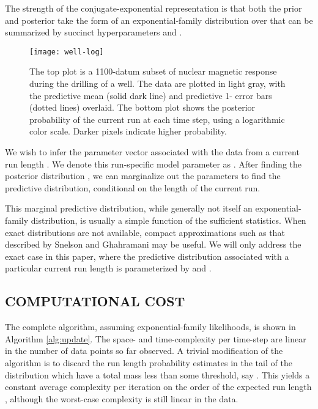 \documentclass[]{article}
\begin{document}
      The strength of the conjugate-exponential representation is that both
      the prior and posterior take the form of an exponential-family
      distribution over  that can be summarized by succinct
      hyperparameters  and .
      

      \begin{figure*}[t]
	\centering
	\texttt{[image: well-log]}
	\vskip -0.5cm
	\caption{The top plot is a 1100-datum subset of nuclear magnetic
	response during the drilling of a well.  The data are plotted in
	light gray, with the predictive mean (solid dark line) and
	predictive 1- error bars (dotted lines) overlaid.  The
	bottom plot shows the posterior probability of the current run
	 at each time step, using a logarithmic
	color scale.  Darker pixels indicate higher probability.}
	\label{fig:well-log}
      \end{figure*}
 
      We wish to infer the parameter vector  associated with the
      data from a current run length .  We denote this run-specific
      model parameter as .  After finding the posterior
      distribution , we
      can marginalize out the parameters to find the predictive
      distribution, conditional on the length of the current run.
      

      This marginal predictive distribution, while generally not itself an
      exponential-family distribution, is usually a simple function of the
      sufficient statistics.  When exact distributions are not available,
      compact approximations such as that described by Snelson and
      Ghahramani \cite{snelson-ghahramani-2005a} may be useful.  We will
      only address the exact case in this paper, where the predictive
      distribution associated with a particular current run length is
      parameterized by  and .
      
    
    \subsection{COMPUTATIONAL COST}
      The complete algorithm, assuming exponential-family likelihoods, is
      shown in Algorithm \ref{alg:update}.  The space- and time-complexity
      per time-step are linear in the number of data points so far
      observed.  A trivial modification of the algorithm is to discard the
      run length probability estimates in the tail of the distribution
      which have a total mass less than some threshold, say .
      This yields a constant average complexity per iteration on the order
      of the expected run length , although the worst-case complexity
      is still linear in the data.
\end{document}
